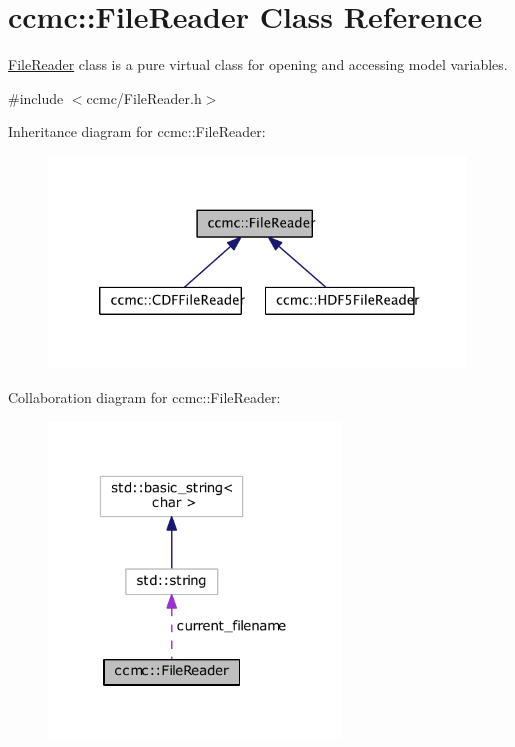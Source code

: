 \hypertarget{classccmc_1_1_file_reader}{\section{ccmc\-:\-:File\-Reader Class Reference}
\label{classccmc_1_1_file_reader}
}


\hyperlink{classccmc_1_1_file_reader}{File\-Reader} class is a pure virtual class for opening and accessing model variables.  




{\ttfamily \#include $<$ccmc/\-File\-Reader.\-h$>$}



Inheritance diagram for ccmc\-:\-:File\-Reader\-:\nopagebreak
\begin{figure}[H]
\begin{center}
\leavevmode
\includegraphics[width=314pt]{classccmc_1_1_file_reader__inherit__graph}
\end{center}
\end{figure}


Collaboration diagram for ccmc\-:\-:File\-Reader\-:\nopagebreak
\begin{figure}[H]
\begin{center}
\leavevmode
\includegraphics[width=220pt]{classccmc_1_1_file_reader__coll__graph}
\end{center}
\end{figure}
